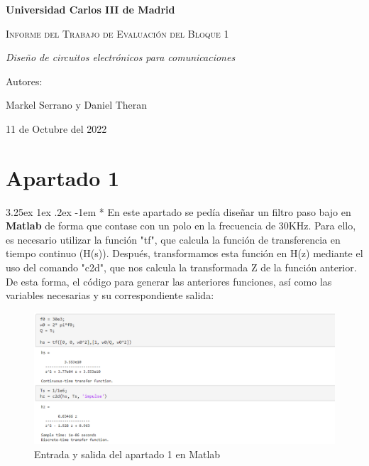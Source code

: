 \documentclass[12pt]{article}
\makeatletter
\renewcommand\paragraph{\@startsection{paragraph}{5}{\z@}%
  {3.25ex \@plus1ex \@minus.2ex}%
  {-1em}%
  {\normalfont\normalsize\bfseries}}
\makeatother
\begin{document}
  \begin{titlepage}
    \centering
   {\bfseries\Large Universidad Carlos III de Madrid \par}
    \vspace{5cm}
    {\scshape\Huge Informe del Trabajo de Evaluación del Bloque 1 \par}
    \vspace{2cm}
    {\itshape\Large Diseño de circuitos electrónicos para comunicaciones}
    \vfill
    {\Large Autores: \par}
    \vspace{1cm}
    {\Large Markel Serrano y Daniel Theran}
    \vfill
    {\Large 11 de Octubre del 2022 \par}
  \end{titlepage}

  \tableofcontents
  \newpage
  
  \section{Apartado 1}

    \paragraph*{}
    En este apartado se pedía diseñar un filtro paso bajo en \textbf{Matlab} de forma que contase con un polo en la frecuencia de 30KHz.
    Para ello, es necesario utilizar la función "tf", que calcula la función de transferencia en tiempo continuo (H(s)).
    Después, transformamos esta función en H(z) mediante el uso del comando "c2d", que nos calcula la transformada Z de la función anterior.
    De esta forma, el código para generar las anteriores funciones, así como las variables necesarias y su correspondiente salida:

    \begin{figure}[H]
      \centering
      \includegraphics[width=1\linewidth]{Img/img_apartado_1.PNG}
      \caption{Entrada y salida del apartado 1 en Matlab}%
      \label{fig:img1}
    \end{figure}
\end{document}
